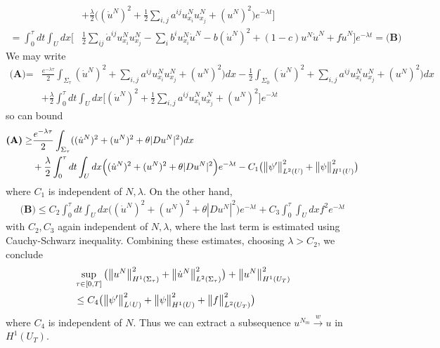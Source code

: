 \documentclass[12pt,a4paper]{report}
\newenvironment{proof}
{\begin{changemargin}{1cm}{0.5cm} 
	}%
	{\end{changemargin}
}
\begin{document}
\begin{proof}
\begin{align*}
&+ \frac{\lambda}{2} \Big( (\dot{u}^N)^2 + \frac{1}{2} \sum_{i,j}a^{ij}u^N_{x_i}u^N_{x_j} + (u^N)^2 \Big)e^{-\lambda t} \bigg] \\
= \int_0^{\tau}dt \int_U dx \Big[ &\frac{1}{2} \sum_{ij} \dot{a}^{ij} u_{x_i}^N u_{x_j}^N - \sum_i b^i u_{x_i}^N \dot{u}^N - b(\dot{u}^N)^2 + (1-c)u^N \dot{u}^N + f\dot{u}^N \Big]e^{-\lambda t} = \textbf{(B)}
\end{align*}
We may write
\begin{align*}
\textbf{(A)} =& \frac{e^{-\lambda \tau}}{2} \int_{\Sigma_{\tau}} ( \dot{u}^N)^2 + \sum_{i,j} a^{ij} u^N_{x_i} u^N_{x_j} +(u^N)^2 )dx - \frac{1}{2} \int_{\Sigma_{0}} ( \dot{u}^N)^2 + \sum_{i,j} a^{ij} u^N_{x_i} u^N_{x_j} +(u^N)^2 )dx \\
&+ \frac{\lambda}{2} \int_0^{\tau} dt \int_U dx \Big[ (\dot{u}^N)^2 + \frac{1}{2} \sum_{i,j}a^{ij}u_{x_i}^N u_{x_j}^N + (u^N)^2 \Big] e^{-\lambda t}
\end{align*}
so can bound
\begin{align*}
\textbf{(A)} \geq & \frac{e^{-\lambda \tau}}{2} \int_{\Sigma_{\tau}} ( ( \dot{u}^N)^2 + (u^N)^2 + \theta |Du^N|^2  ) dx \\
&+ \frac{\lambda}{2} \int_0^{\tau} dt \int_U dx \Big( (\dot{u}^N)^2 + (u^N)^2 + \theta |Du^N|^2 \Big) e^{-\lambda t} - C_1 \big( \bigl\lVert\psi'\bigr\rVert_{L^2(U)}^2 + \bigl\lVert\psi\bigr\rVert_{H^1(U)}^2 \big)
\end{align*}
where $C_1$ is independent of $N, \lambda$. On the other hand,
\begin{align*}
\textbf{(B)} \leq C_2 \int_0^{\tau} dt \int_U dx \Big( (\dot{u}^N)^2 + (u^N)^2 + \theta |Du^N|^2 \Big) e^{-\lambda t} + C_3 \int_0^{\tau} \int_U dx f^2 e^{-\lambda t} 
\end{align*}
with $C_2, C_3$ again independent of $N, \lambda$, where the last term is estimated using Cauchy-Schwarz inequality. Combining these estimates, choosing $\lambda > C_2$, we conclude
\begin{align*}
&\sup_{\tau \in [0,T]} \big( \bigl\lVert u^N\bigr\rVert_{H^1(\Sigma_{\tau})}^2 + \bigl\lVert\dot{u}^N\bigr\rVert_{L^2(\Sigma_{\tau})}^2 \big) + \bigl\lVert u^N\bigr\rVert_{H^1(U_T)}^2  \\
& \leq C_4 \big( \bigl\lVert\psi'\bigr\rVert_{L^(U)}^2 + \bigl\lVert\psi\bigr\rVert_{H^1(U)}^2 + \bigl\lVert f\bigr\rVert_{L^2(U_T)}^2 \big)
\end{align*}
where $C_4$ is independent of $N$. Thus we can extract a subsequence $u^{N_m} \xrightarrow{w} u$ in $H^1(U_T)$.


\end{proof}
\end{document}
